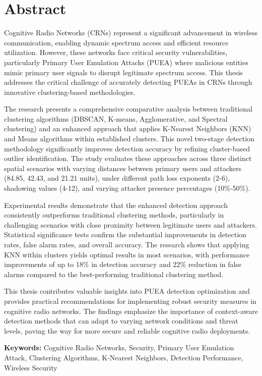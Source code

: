 \chapter*{Abstract}

Cognitive Radio Networks (CRNs) represent a significant advancement in wireless communication, enabling dynamic spectrum access and efficient resource utilization. However, these networks face critical security vulnerabilities, particularly Primary User Emulation Attacks (PUEA) where malicious entities mimic primary user signals to disrupt legitimate spectrum access. This thesis addresses the critical challenge of accurately detecting PUEAs in CRNs through innovative clustering-based methodologies.

The research presents a comprehensive comparative analysis between traditional clustering algorithms (DBSCAN, K-means, Agglomerative, and Spectral clustering) and an enhanced approach that applies K-Nearest Neighbors (KNN) and Means algorithms within established clusters. This novel two-stage detection methodology significantly improves detection accuracy by refining cluster-based outlier identification. The study evaluates these approaches across three distinct spatial scenarios with varying distances between primary users and attackers (84.85, 42.43, and 21.21 units), under different path loss exponents (2-6), shadowing values (4-12), and varying attacker presence percentages (10\%-50\%).

Experimental results demonstrate that the enhanced detection approach consistently outperforms traditional clustering methods, particularly in challenging scenarios with close proximity between legitimate users and attackers. Statistical significance tests confirm the substantial improvements in detection rates, false alarm rates, and overall accuracy. The research shows that applying KNN within clusters yields optimal results in most scenarios, with performance improvements of up to 18\% in detection accuracy and 22\% reduction in false alarms compared to the best-performing traditional clustering method.

This thesis contributes valuable insights into PUEA detection optimization and provides practical recommendations for implementing robust security measures in cognitive radio networks. The findings emphasize the importance of context-aware detection methods that can adapt to varying network conditions and threat levels, paving the way for more secure and reliable cognitive radio deployments.

\vspace{1cm}
\noindent\textbf{Keywords:} Cognitive Radio Networks, Security, Primary User Emulation Attack, Clustering Algorithms, K-Nearest Neighbors, Detection Performance, Wireless Security
